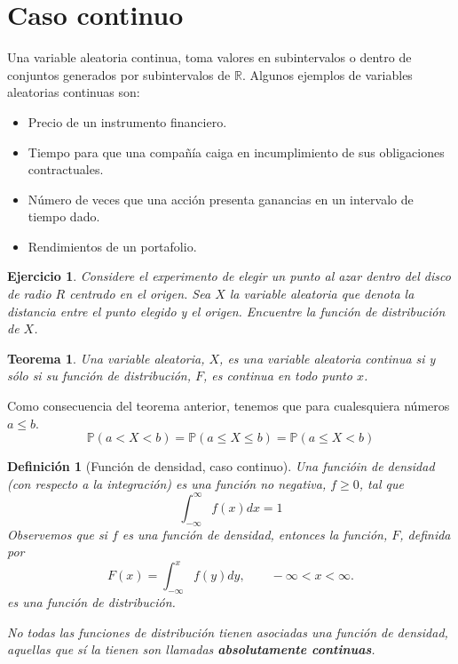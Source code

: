 \documentclass[11pt]{report}
\theoremstyle{break}
\newtheorem{definicion}{Definición}[chapter]
\newtheorem{teorema}{Teorema}[chapter]
\newtheorem{ejercicio}{Ejercicio}[chapter]
\theoremstyle{break}
\begin{document}
\section{Caso continuo}
\label{seccion:variables continuas}
Una variable aleatoria continua, toma valores en subintervalos o dentro de conjuntos generados por subintervalos de $\mathbb{R}$. Algunos ejemplos de variables aleatorias continuas son:
\begin{itemize}
\item Precio de un instrumento financiero.
\item Tiempo para que una compañía caiga en incumplimiento de sus obligaciones contractuales.
\item Número de veces que una acción presenta ganancias en un intervalo de tiempo dado.
\item Rendimientos de un portafolio.
\end{itemize}

\begin{ejercicio}
Considere el experimento de elegir un punto al azar dentro del disco de radio $R$ centrado en el origen. Sea $X$ la variable aleatoria que denota la distancia entre el punto elegido y el origen. Encuentre la función de distribución de $X$.
\end{ejercicio}

\begin{teorema}
Una variable aleatoria, $X$, es una variable aleatoria continua si y sólo si su función de distribución, $F$, es continua en todo punto $x$.
\end{teorema}
Como consecuencia del teorema anterior, tenemos que para cualesquiera números $a \leq b$.
$$
\mathbb{P}(a < X < b) = \mathbb{P}(a \leq X \leq b) = \mathbb{P}(a \leq X < b)
$$

\begin{definicion}[Función de densidad, caso continuo]
\label{definicion:funcion de densidad caso continuo}
Una funcióin de densidad (con respecto a la integración) es una función no negativa, $f\geq 0$, tal que 
$$
\int_{-\infty}^{\infty} f(x)dx = 1
$$
Observemos que si $f$ es una función de densidad, entonces la función, $F$, definida por
$$
F(x) = \int_{- \infty}^{x} f(y)dy, \qquad -\infty < x < \infty.
$$
es una función de distribución.

No todas las funciones de distribución tienen asociadas una función de densidad, aquellas que sí la tienen son llamadas \textbf{absolutamente continuas}.
\end{definicion}
\end{document}
